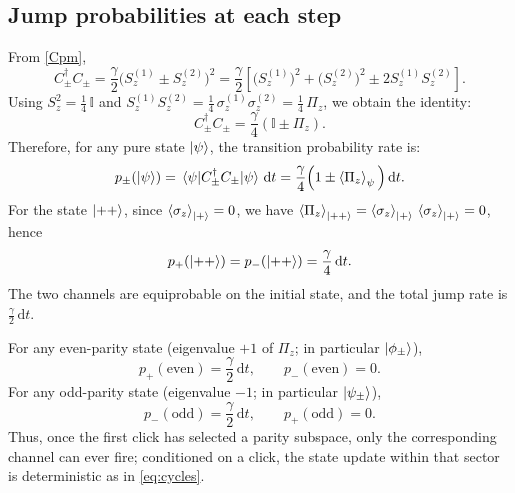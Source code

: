 \documentclass[12pt,a4paper]{article}
\begin{document}
	\subsection{Jump probabilities at each step}
	From \eqref{Cpm},
	\begin{equation}
		C_\pm^\dagger C_\pm
		=\frac{\gamma}{2}\big(S_z^{(1)}\pm S_z^{(2)}\big)^2
		=\frac{\gamma}{2}\left[\big(S_z^{(1)}\big)^2+\big(S_z^{(2)}\big)^2\pm2S_z^{(1)}S_z^{(2)}\right].
	\end{equation}
	Using \(S_z^2=\tfrac{1}{4}\,\mathbb{I}\) and \(S_z^{(1)}S_z^{(2)}=\tfrac{1}{4}\,\sigma_z^{(1)}\sigma_z^{(2)}=\tfrac{1}{4}\,\Pi_z\), we obtain the identity:
	\begin{equation}
		C_\pm^\dagger C_\pm
		=\frac{\gamma}{4}\left(\mathbb{I}\pm \Pi_z\right).
		\label{eq:rate_identity}
	\end{equation}
	Therefore, for any pure state \(\ket{\psi}\), the transition probability rate is:
	\begin{equation}
		p_\pm(\ket{\psi})=\matrixel{\psi}{C_\pm^\dagger C_\pm}{\psi}\,\mathrm{d}t
		=\frac{\gamma}{4}\Big(1\pm \ev{\Pi_z}_{\psi}\Big)\,\mathrm{d}t.
		\label{eq:general_rate}
	\end{equation}
	For the state \(\ket{++}\), since \(\ev{\sigma_z}_{\ket{+}}=0\), we have \(\ev{\Pi_z}_{\ket{++}}=\ev{\sigma_z}_{\ket{+}}\,\ev{\sigma_z}_{\ket{+}}=0\), hence
	\begin{equation}
		p_+(\ket{++})=p_-(\ket{++})=\frac{\gamma}{4}\,\mathrm{d}t.
		\label{eq:rates_pp}
	\end{equation}
	The two channels are equiprobable on the initial state, and the total jump rate is \(\tfrac{\gamma}{2}\,\mathrm{d}t\).

	For any even-parity state (eigenvalue \(+1\) of \(\Pi_z\); in particular \(\ket{\phi_\pm}\)),
	\begin{equation}
		p_+(\text{even})=\frac{\gamma}{2}\,\mathrm{d}t,\qquad p_-(\text{even})=0.
	\end{equation}
	For any odd-parity state (eigenvalue \(-1\); in particular \(\ket{\psi_\pm}\)),
	\begin{equation}
		p_-(\text{odd})=\frac{\gamma}{2}\,\mathrm{d}t,\qquad p_+(\text{odd})=0.
	\end{equation}
	Thus, once the first click has selected a parity subspace, only the corresponding channel can ever fire; conditioned on a click, the state update within that sector is deterministic as in \eqref{eq:cycles}.
	
\end{document}
